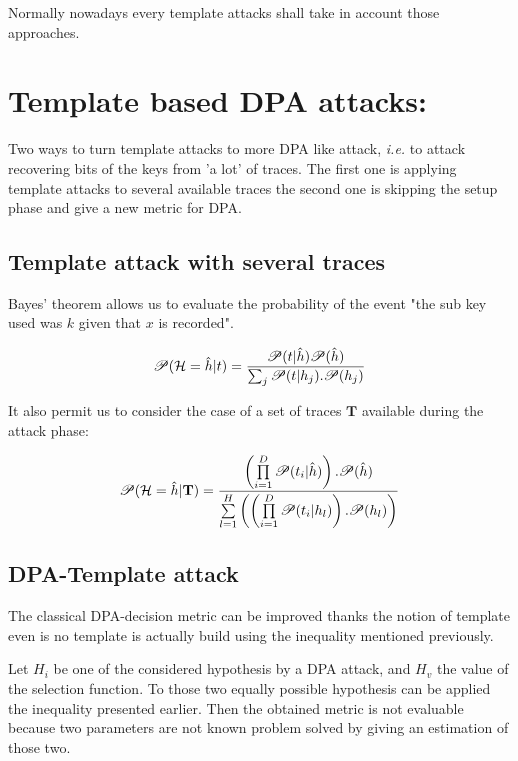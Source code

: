 Normally nowadays every template attacks shall take in account those approaches.






\newpage
\section{Template based DPA attacks:}

Two ways to turn template attacks to more DPA like attack, \textit{i.e.} 
to attack recovering bits of the keys from 'a lot' of traces. The first 
one is applying template attacks to several available traces the second 
one is skipping the setup phase and give a new metric for DPA.

\subsection{Template attack with several traces}
 Bayes' theorem allows us to evaluate the probability of the event
 "the sub key used was $ k $ given that $ x $ is recorded". 
\begin{center}
$$\mbox{\huge}
{ \mathscr{P}(\mathcal{H}=\hat{h}| t) = 
\frac{ \mathscr{P}(t | \hat{h} )\mathscr{P}(\hat{h}) }{ \sum_j \mathscr{P}(t | h_j).\mathscr{P}(h_j) } }  $$
\end{center}
It also permit us to consider the case of a set of traces $\mathbf{T}$ available during the attack phase:
\begin{center}
$$\mbox{\Huge}{ 
\mathscr{P}(\mathcal{H}=\hat{h} | \mathbf{T}) =
\frac{
\left( \prod\limits_{i=1}^D\mathscr{P}(t_i | \hat{h}) \right).\mathscr{P}(\hat{h})
}{
\sum\limits_{l=1}^H
\left( \left( \prod\limits_{i=1}^D\mathscr{P}(t_i | h_l) \right).\mathscr{P}(h_l)\right)
}
				}  $$			
\end{center}


\subsection{DPA-Template attack}
The classical DPA-decision metric can be improved thanks the notion of template even is no 
template is actually build using the inequality mentioned previously.

Let $H_i$ be one of the considered hypothesis by a DPA attack, and $H_v$ the value of the selection function.
To those two equally possible hypothesis can be applied the inequality presented earlier. Then the obtained metric is not evaluable because two parameters are not known problem solved by giving an estimation of those two.

